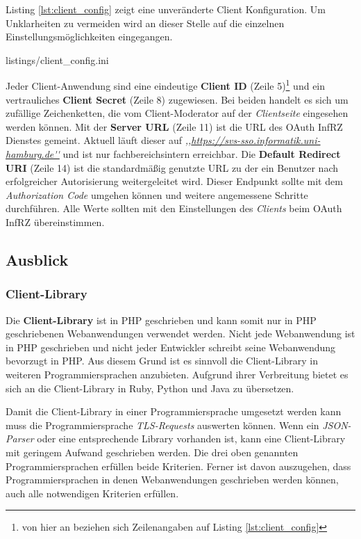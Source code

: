 \documentclass[12pt,a4paper,pointednumbers,abstracton]{scrartcl}
\begin{document}
Listing \ref{lst:client_config} zeigt eine unveränderte Client Konfiguration.
Um Unklarheiten zu vermeiden wird an dieser Stelle auf die einzelnen Einstellungsmöglichkeiten eingegangen.

\begin{minipage}{\textwidth}
	
	{listings/client_config.ini}
\end{minipage}

Jeder Client-Anwendung sind eine eindeutige \textbf{Client ID} (Zeile 5)\footnote{von hier an beziehen sich Zeilenangaben auf Listing \ref{lst:client_config}} und ein vertrauliches \textbf{Client Secret} (Zeile 8) zugewiesen.
Bei beiden handelt es sich um zufällige Zeichenketten, die vom Client-Moderator auf der \emph{Clientseite} eingesehen werden können.
Mit der \textbf{Server URL} (Zeile 11) ist die URL des OAuth InfRZ Dienstes gemeint.
Aktuell läuft dieser auf \emph{,,\url{https://svs-sso.informatik.uni-hamburg.de''}} und ist nur fachbereichsintern erreichbar.
Die \textbf{Default Redirect URI} (Zeile 14) ist die standardmäßig genutzte URL zu der ein Benutzer nach erfolgreicher Autorisierung weitergeleitet wird.
Dieser Endpunkt sollte mit dem \emph{Authorization Code} umgehen können und weitere angemessene Schritte durchführen.
Alle Werte sollten mit den Einstellungen des \emph{Clients} beim OAuth InfRZ übereinstimmen.

\subsection{Ausblick}

\subsubsection{Client-Library}

Die \textbf{Client-Library} ist in PHP geschrieben und kann somit nur in PHP geschriebenen Webanwendungen verwendet werden.
Nicht jede Webanwendung ist in PHP geschrieben und nicht jeder Entwickler schreibt seine Webanwendung bevorzugt in PHP.
Aus diesem Grund ist es sinnvoll die Client-Library in weiteren Programmiersprachen anzubieten.
Aufgrund ihrer Verbreitung bietet es sich an die Client-Library in Ruby, Python und Java zu übersetzen.

Damit die Client-Library in einer Programmiersprache umgesetzt werden kann muss die Programmiersprache \emph{TLS-Requests} auswerten können.
Wenn ein \emph{JSON-Parser} oder eine entsprechende Library vorhanden ist, kann eine Client-Library mit geringem Aufwand geschrieben werden.
Die drei oben genannten Programmiersprachen erfüllen beide Kriterien.
Ferner ist davon auszugehen, dass Programmiersprachen in denen Webanwendungen geschrieben werden können, auch alle notwendigen Kriterien erfüllen. 
\end{document}
